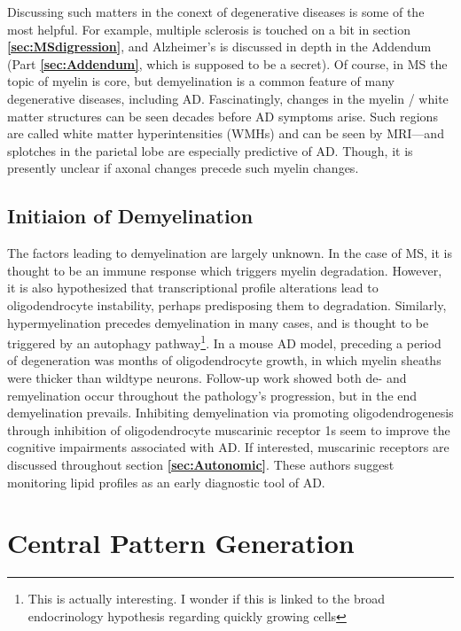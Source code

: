 Discussing such matters in the conext of degenerative diseases is some of the most helpful. For example, multiple sclerosis is touched on a bit in section \textbf{\ref{sec:MSdigression}}, and Alzheimer's is discussed in depth in the Addendum (Part \textbf{\ref{sec:Addendum}}, which is supposed to be a secret). Of course, in MS the topic of myelin is core, but demyelination is a common feature of many degenerative diseases, including AD. Fascinatingly, changes in the myelin / white matter structures can be seen decades before AD symptoms arise. Such regions are called white matter hyperintensities (WMHs) and can be seen by MRI---and splotches in the parietal lobe are especially predictive of AD. Though, it is presently unclear if axonal changes precede such myelin changes.

\subsection{Initiaion of Demyelination}

The factors leading to demyelination are largely unknown. In the case of MS, it is thought to be an immune response which triggers myelin degradation. However, it is also hypothesized that transcriptional profile alterations lead to oligodendrocyte instability, perhaps predisposing them to degradation. Similarly, hypermyelination precedes demyelination in many cases, and is thought to be triggered by an autophagy pathway\footnote{This is actually interesting. I wonder if this is linked to the broad endocrinology hypothesis regarding quickly growing cells}. In a mouse AD model, preceding a period of degeneration was months of oligodendrocyte growth, in which myelin sheaths were thicker than wildtype neurons. Follow-up work showed both de- and remyelination occur throughout the pathology's progression, but in the end demyelination prevails. Inhibiting demyelination via promoting oligodendrogenesis through inhibition of oligodendrocyte muscarinic receptor 1s seem to improve the cognitive impairments associated with AD. If interested, muscarinic receptors are discussed throughout section \textbf{\ref{sec:Autonomic}}. These authors suggest monitoring lipid profiles as an early diagnostic tool of AD.   



\section{Central Pattern Generation}

